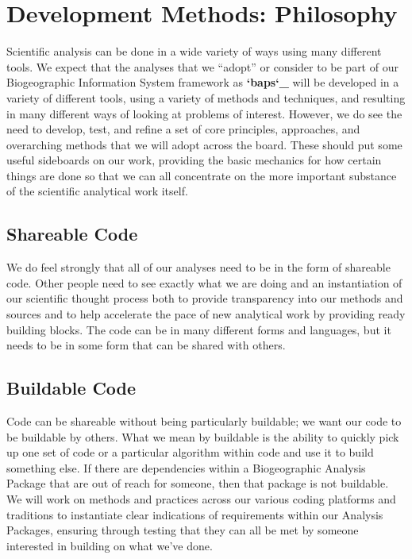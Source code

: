 \documentclass[letterpaper,10pt,english]{sphinxmanual}
\begin{document}
\chapter{Development Methods: Philosophy}
\label{\detokenize{devmethods:devmethods}}\label{\detokenize{devmethods:development-methods-philosophy}}\label{\detokenize{devmethods::doc}}
Scientific analysis can be done in a wide variety of ways using many different tools. We expect that the analyses that we “adopt” or consider to be part of our Biogeographic Information System framework as {\color{red}\bfseries{}{}`baps{}`\_} will be developed in a variety of different tools, using a variety of methods and techniques, and resulting in many different ways of looking at problems of interest. However, we do see the need to develop, test, and refine a set of core principles, approaches, and overarching methods that we will adopt across the board. These should put some useful sideboards on our work, providing the basic mechanics for how certain things are done so that we can all concentrate on the more important substance of the scientific analytical work itself.


\section{Shareable Code}
\label{\detokenize{devmethods:shareable-code}}
We do feel strongly that all of our analyses need to be in the form of shareable code. Other people need to see exactly what we are doing and an instantiation of our scientific thought process both to provide transparency into our methods and sources and to help accelerate the pace of new analytical work by providing ready building blocks. The code can be in many different forms and languages, but it needs to be in some form that can be shared with others.


\section{Buildable Code}
\label{\detokenize{devmethods:buildable-code}}
Code can be shareable without being particularly buildable; we want our code to be buildable by others. What we mean by buildable is the ability to quickly pick up one set of code or a particular algorithm within code and use it to build something else. If there are dependencies within a Biogeographic Analysis Package that are out of reach for someone, then that package is not buildable. We will work on methods and practices across our various coding platforms and traditions to instantiate clear indications of requirements within our Analysis Packages, ensuring through testing that they can all be met by someone interested in building on what we’ve done.
\end{document}
